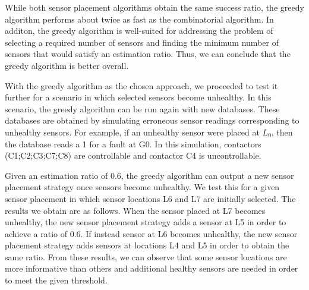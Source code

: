 \documentclass[journal]{IEEEtran}
\begin{document}
While both sensor placement algorithms obtain the same success ratio, the greedy algorithm performs about twice as fast as the combinatorial algorithm. In additon, the greedy algorithm is well-suited for addressing the problem of selecting a required number of sensors and finding the minimum number of sensors that would satisfy an estimation ratio. Thus, we can conclude that the greedy algorithm is better overall.

With the greedy algorithm as the chosen approach, we proceeded to test it further for a scenario in which selected sensors become unhealthy. In this scenario, the greedy algorithm can be run again with new databases. These databases are obtained by simulating erroneous sensor readings corresponding to unhealthy sensors. For example, if an unhealthy sensor were placed at $L_{0}$, then the database reads a 1 for a fault at G0. In this simulation, contactors (C1;C2;C3;C7;C8) are controllable and contactor C4 is uncontrollable. 

Given an estimation ratio of 0.6, the greedy algorithm can output a new sensor placement strategy once sensors become unhealthy. We test this for a given sensor placement in which sensor locations L6 and L7 are initially selected. The results we obtain are as follows. When the sensor placed at L7 becomes unhealthy, the new sensor placement strategy adds a sensor at L5 in order to achieve a ratio of 0.6. If instead sensor at L6 becomes unhealthy, the new sensor placement strategy adds sensors at locations L4 and L5 in order to obtain the same ratio. From these results, we can observe that some sensor locations are more informative than others and additional healthy sensors are needed in order to meet the given threshold.  
\end{document}
